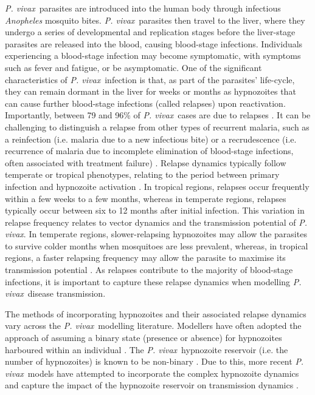 \documentclass[12pt]{article}
\newcommand{\pv}{\textit{P. vivax}}
\begin{document}
\pv~parasites are introduced into the human body through infectious \textit{Anopheles} mosquito bites. \pv~parasites then travel to the liver, where they undergo a series of developmental and replication stages \cite{ jones2006malaria,kebaier2009kinetics} before the liver-stage parasites are released into the blood, causing blood-stage infections. Individuals experiencing a blood-stage infection may become symptomatic, with symptoms such as fever and fatigue, or be asymptomatic. One of the significant characteristics of \pv~infection is that, as part of the parasites' life-cycle, they can remain dormant in the liver for weeks or months \cite{imwong2007relapses} as hypnozoites that can cause further blood-stage infections (called relapses) upon reactivation. Importantly, between 79 and 96\% of \pv~cases are due to relapses \cite{robinson2015strategies,huber2021radical,adekunle2015modeling,commons2020estimating}. It can be challenging to distinguish a relapse from other types of recurrent malaria, such as a reinfection (i.e. malaria due to a new infectious bite) or a recrudescence (i.e. recurrence of malaria due to incomplete elimination of blood-stage infections, often associated with treatment failure) \cite{ghosh2020mathematical}. Relapse dynamics typically follow temperate or tropical phenotypes, relating to the period between primary infection and hypnozoite activation \cite{lover2013quantifying}. In tropical regions, relapses occur frequently within a few weeks to a few months, whereas in temperate regions, relapses typically occur between six to 12 months after initial infection. This variation in relapse frequency relates to vector dynamics and the transmission potential of \pv. In temperate regions, slower-relapsing hypnozoites may allow the parasites to survive colder months when mosquitoes are less prevalent, whereas, in tropical regions, a faster relapsing frequency may allow the parasite to maximise its transmission potential \cite{battle2014geographical,hulden2011activation}. As relapses contribute to the majority of blood-stage infections, it is important to capture these relapse dynamics when modelling \pv~disease transmission. 

The methods of incorporating hypnozoites and their associated relapse dynamics vary across the \pv~modelling literature. Modellers have often adopted the approach of assuming a binary state (presence or absence) for hypnozoites harboured within an individual \cite{ishikawa2000prevalence,ishikawa2003mathematical,fujita2006modeling,robinson2015strategies,champagne2022using}. The \pv~hypnozoite reservoir (i.e. the number of hypnozoites) is known to be non-binary \cite{white2014modelling,white2016variation}. Due to this, more recent \pv~models have attempted to incorporate the complex hypnozoite dynamics and capture the impact of the hypnozoite reservoir on transmission dynamics \cite{white2014modelling,mehra2022hypnozoite,anwar2022multiscale,thesis_somya,anwar2023optimal}. 
\end{document}

